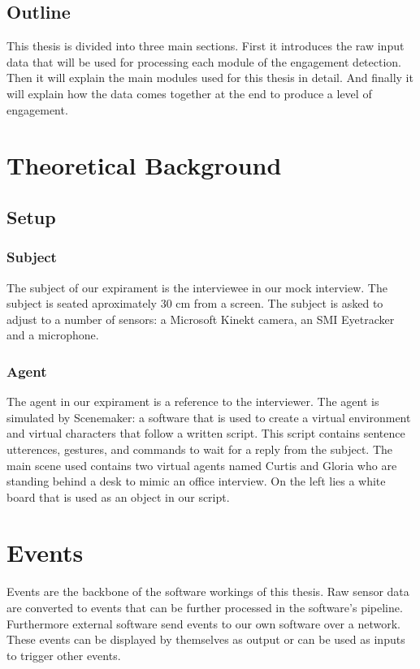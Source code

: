 \documentclass[12pt, a4paper, fleqn]{memoir}%
\begin{document}
\section{Outline}
\label{sec:Outline}
This thesis is divided into three main sections. First it introduces the raw input data that will be used for processing each module of the engagement detection. Then it will explain the main modules used for this thesis in detail. And finally it will explain how the data comes together at the end to produce a level of engagement.

\chapter{Theoretical Background}
\label{chap:TheoreticalBackground}

\section{Setup}
\label{sec:Section}

\subsection{Subject}
The subject of our expirament is the interviewee in our mock interview. The subject is seated aproximately 30 cm from a screen. The subject is asked to adjust to a number of sensors: a Microsoft Kinekt camera, an SMI Eyetracker and a microphone.

\subsection{Agent}
The agent in our expirament is a reference to the interviewer. The agent is simulated by Scenemaker: a software that is used to create a virtual environment and virtual characters that follow a written script. This script contains sentence utterences, gestures, and commands to wait for a reply from the subject. The main scene used contains two virtual agents named Curtis and Gloria who are standing behind a desk to mimic an office interview. On the left lies a white board that is used as an object in our script.

\chapter{Events}
\label{chap:Events}
Events are the backbone of the software workings of this thesis. Raw sensor data are converted to events that can be further processed in the software's pipeline. Furthermore external software send events to our own software over a network. These events can be displayed by themselves as output or can be used as inputs to trigger other events.
\end{document}

